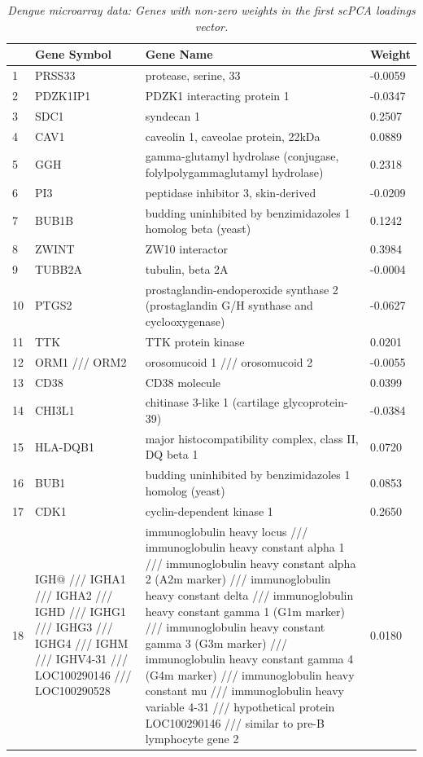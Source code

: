 \begin{longtable}{| l | p{4cm} | p{8cm} | l |}
  \caption{{\em Dengue microarray data: Genes with non-zero weights in the first scPCA loadings vector.}}
  \label{tab:dengue_1} \\
  \hline
    & Gene Symbol & Gene Name & Weight \\ 
  \hline
  \endhead
  1 & PRSS33 & protease, serine, 33 & -0.0059 \\ 
  2 & PDZK1IP1 & PDZK1 interacting protein 1 & -0.0347 \\ 
  3 & SDC1 & syndecan 1 & 0.2507 \\ 
  4 & CAV1 & caveolin 1, caveolae protein, 22kDa & 0.0889 \\ 
  5 & GGH & gamma-glutamyl hydrolase (conjugase, folylpolygammaglutamyl hydrolase) & 0.2318 \\ 
  6 & PI3 & peptidase inhibitor 3, skin-derived & -0.0209 \\ 
  7 & BUB1B & budding uninhibited by benzimidazoles 1 homolog beta (yeast) & 0.1242 \\ 
  8 & ZWINT & ZW10 interactor & 0.3984 \\ 
  9 & TUBB2A & tubulin, beta 2A & -0.0004 \\ 
  10 & PTGS2 & prostaglandin-endoperoxide synthase 2 (prostaglandin G/H synthase and cyclooxygenase) & -0.0627 \\ 
  11 & TTK & TTK protein kinase & 0.0201 \\ 
  12 & ORM1 /// ORM2 & orosomucoid 1 /// orosomucoid 2 & -0.0055 \\ 
  13 & CD38 & CD38 molecule & 0.0399 \\ 
  14 & CHI3L1 & chitinase 3-like 1 (cartilage glycoprotein-39) & -0.0384 \\ 
  15 & HLA-DQB1 & major histocompatibility complex, class II, DQ beta 1 & 0.0720 \\ 
  16 & BUB1 & budding uninhibited by benzimidazoles 1 homolog (yeast) & 0.0853 \\ 
  17 & CDK1 & cyclin-dependent kinase 1 & 0.2650 \\ 
  18 & IGH@ /// IGHA1 /// IGHA2 /// IGHD /// IGHG1 /// IGHG3 /// IGHG4 /// IGHM /// IGHV4-31 /// LOC100290146 /// LOC100290528 & immunoglobulin heavy locus /// immunoglobulin heavy constant alpha 1 /// immunoglobulin heavy constant alpha 2 (A2m marker) /// immunoglobulin heavy constant delta /// immunoglobulin heavy constant gamma 1 (G1m marker) /// immunoglobulin heavy constant gamma 3 (G3m marker) /// immunoglobulin heavy constant gamma 4 (G4m marker) /// immunoglobulin heavy constant mu /// immunoglobulin heavy variable 4-31 /// hypothetical protein LOC100290146 /// similar to pre-B lymphocyte gene 2 & 0.0180 \\ 

\end{longtable}
